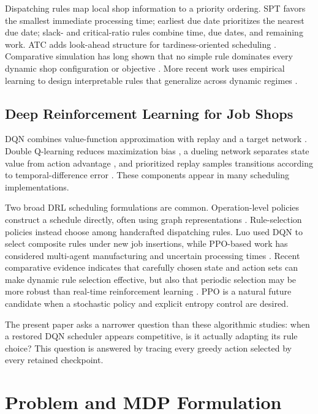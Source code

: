 \documentclass[conference]{IEEEtran}
\newcommand{\method}[1]{\textsc{#1}}
\newcommand{\dqn}{\method{DQN}}
\newcommand{\spt}{\method{SPT}}
\newcommand{\atc}{\method{ATC}}
\begin{document}
Dispatching rules map local shop information to a priority ordering. \spt{} favors the smallest immediate processing time; earliest due date prioritizes the nearest due date; slack- and critical-ratio rules combine time, due dates, and remaining work. \atc{} adds look-ahead structure for tardiness-oriented scheduling \cite{vepsalainen1987atc}. Comparative simulation has long shown that no simple rule dominates every dynamic shop configuration or objective \cite{rajendran1999dispatching}. More recent work uses empirical learning to design interpretable rules that generalize across dynamic regimes \cite{ferreira2022interpretable}.

\subsection{Deep Reinforcement Learning for Job Shops}

\dqn{} combines value-function approximation with replay and a target network \cite{mnih2015dqn}. Double Q-learning reduces maximization bias \cite{vanhasselt2016double}, a dueling network separates state value from action advantage \cite{wang2016dueling}, and prioritized replay samples transitions according to temporal-difference error \cite{schaul2016per}. These components appear in many scheduling implementations.

Two broad DRL scheduling formulations are common. Operation-level policies construct a schedule directly, often using graph representations \cite{zhang2020l2d}. Rule-selection policies instead choose among handcrafted dispatching rules. Luo \cite{luo2020dynamic} used DQN to select composite rules under new job insertions, while PPO-based work has considered multi-agent manufacturing and uncertain processing times \cite{zhang2022multiagent,wu2024uncertain}. Recent comparative evidence indicates that carefully chosen state and action sets can make dynamic rule selection effective, but also that periodic selection may be more robust than real-time reinforcement learning \cite{marques2025selection}. PPO \cite{schulman2017ppo} is a natural future candidate when a stochastic policy and explicit entropy control are desired.

The present paper asks a narrower question than these algorithmic studies: when a restored \dqn{} scheduler appears competitive, is it actually adapting its rule choice? This question is answered by tracing every greedy action selected by every retained checkpoint.

\section{Problem and MDP Formulation}
\end{document}
